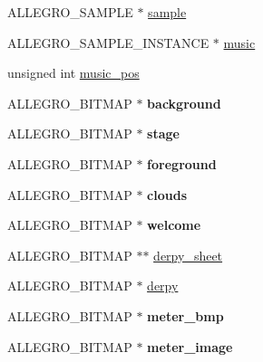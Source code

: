\begin{DoxyCompactItemize}
\item 
\-A\-L\-L\-E\-G\-R\-O\-\_\-\-S\-A\-M\-P\-L\-E $\ast$ \hyperlink{structLevel_a234fa7b9ec35dd360e4e3c48a944fc7d}{sample}
\item 
\-A\-L\-L\-E\-G\-R\-O\-\_\-\-S\-A\-M\-P\-L\-E\-\_\-\-I\-N\-S\-T\-A\-N\-C\-E $\ast$ \hyperlink{structLevel_a41c6aae8f508e078b02c291e1d6f8e67}{music}
\item 
unsigned int \hyperlink{structLevel_a13e322deb3298846260af31324e5b492}{music\-\_\-pos}
\item 
\hypertarget{structLevel_a4b4dd31284206502977b3d5b95d52abc}{\-A\-L\-L\-E\-G\-R\-O\-\_\-\-B\-I\-T\-M\-A\-P $\ast$ {\bfseries background}}\label{structLevel_a4b4dd31284206502977b3d5b95d52abc}

\item 
\hypertarget{structLevel_a70b6ea7746ac88775b4197349ec312d1}{\-A\-L\-L\-E\-G\-R\-O\-\_\-\-B\-I\-T\-M\-A\-P $\ast$ {\bfseries stage}}\label{structLevel_a70b6ea7746ac88775b4197349ec312d1}

\item 
\hypertarget{structLevel_aa2b1c77ee0c36e44efb3a908cf4967dc}{\-A\-L\-L\-E\-G\-R\-O\-\_\-\-B\-I\-T\-M\-A\-P $\ast$ {\bfseries foreground}}\label{structLevel_aa2b1c77ee0c36e44efb3a908cf4967dc}

\item 
\hypertarget{structLevel_a94266a3fc732a379240d54111cc70cce}{\-A\-L\-L\-E\-G\-R\-O\-\_\-\-B\-I\-T\-M\-A\-P $\ast$ {\bfseries clouds}}\label{structLevel_a94266a3fc732a379240d54111cc70cce}

\item 
\hypertarget{structLevel_a575fec7686bd94b5c35b15d73296c977}{\-A\-L\-L\-E\-G\-R\-O\-\_\-\-B\-I\-T\-M\-A\-P $\ast$ {\bfseries welcome}}\label{structLevel_a575fec7686bd94b5c35b15d73296c977}

\item 
\-A\-L\-L\-E\-G\-R\-O\-\_\-\-B\-I\-T\-M\-A\-P $\ast$$\ast$ \hyperlink{structLevel_a0e02f3a5674a2ad3c23de22b6a4ed044}{derpy\-\_\-sheet}
\item 
\-A\-L\-L\-E\-G\-R\-O\-\_\-\-B\-I\-T\-M\-A\-P $\ast$ \hyperlink{structLevel_ae33832497116b7a0c184959bbde21ee5}{derpy}
\item 
\hypertarget{structLevel_a4e78a54cbf3cdcc804f65acb03cef0b3}{\-A\-L\-L\-E\-G\-R\-O\-\_\-\-B\-I\-T\-M\-A\-P $\ast$ {\bfseries meter\-\_\-bmp}}\label{structLevel_a4e78a54cbf3cdcc804f65acb03cef0b3}

\item 
\hypertarget{structLevel_a68d46fe7302709916195b9f9ce42ca85}{\-A\-L\-L\-E\-G\-R\-O\-\_\-\-B\-I\-T\-M\-A\-P $\ast$ {\bfseries meter\-\_\-image}}\label{structLevel_a68d46fe7302709916195b9f9ce42ca85}


\end{DoxyCompactItemize}
